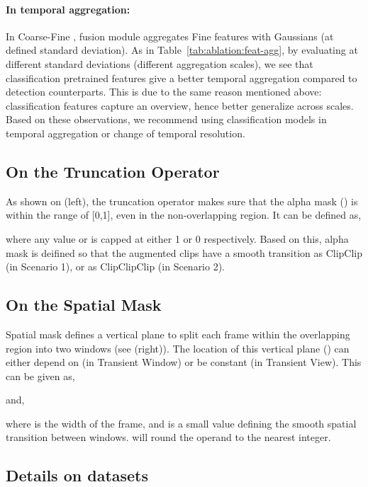 \documentclass[letterpaper]{article} \usepackage{aaai23}  \usepackage{times}  \usepackage{helvet}  \usepackage{courier}  \usepackage[hyphens]{url}  \usepackage{graphicx} \urlstyle{rm} \def\UrlFont{\rm}  \usepackage{natbib}  \usepackage{caption} \frenchspacing  \setlength{\pdfpagewidth}{8.5in}  \setlength{\pdfpageheight}{11in}  \usepackage{algorithm}
\newcommand{\tref}[1]{Table~\ref{#1}}
\newcommand{\ch}{}
\begin{document}
\paragraph{In temporal aggregation:} In Coarse-Fine \cite{kahatapitiya2021coarse}, fusion module aggregates Fine features with Gaussians (at defined standard deviation). As in \tref{tab:ablation:feat-agg}, by evaluating at different standard deviations (different aggregation scales), we see that classification pretrained features give a better temporal aggregation compared to detection counterparts. This is due to the same reason mentioned above: classification features capture an overview, hence better generalize across scales. \ch{Based on these observations, we recommend using classification models in temporal aggregation or change of temporal resolution.}

\subsection{On the Truncation Operator }
\label{app:a}

As shown on  (left), the truncation operator  makes sure that the alpha mask () is within the range of [0,1], even in the non-overlapping region. It can be defined as,
{\small

}where any value  or  is capped at either 1 or 0 respectively. Based on this, alpha mask  is deifined so that the augmented clips have a smooth transition as ClipClip (in Scenario 1), or as ClipClipClip (in Scenario 2).

\subsection{On the Spatial Mask }
\label{app:b}

Spatial mask  defines a vertical plane to split each frame within the overlapping region into two windows (see  (right)). The location of this vertical plane () can either depend on  (in Transient Window) or be constant (in Transient View). This can be given as,
{\small

}and,
{\small

}where  is the width of the frame, and  is a small value defining the smooth spatial transition between windows.  will round the operand to the nearest integer.

\subsection{Details on datasets}
\end{document}
